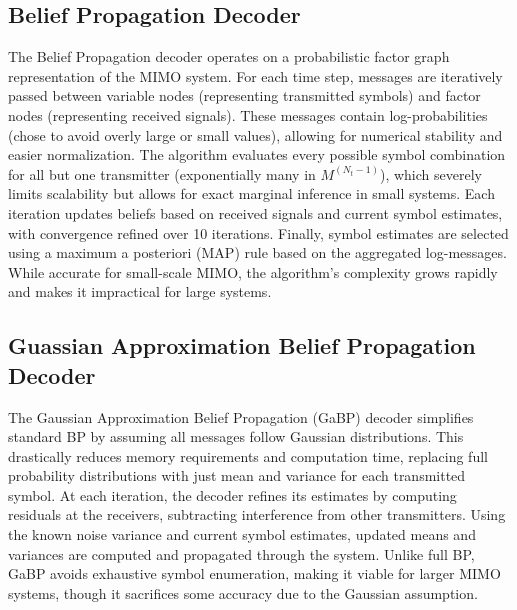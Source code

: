 \documentclass[conference]{IEEEtran}
\begin{document}
\subsection{Belief Propagation Decoder}
The Belief Propagation decoder operates on a probabilistic factor graph representation of the MIMO system. For each time step, messages are iteratively passed between variable nodes (representing transmitted symbols) and factor nodes (representing received signals). These messages contain log-probabilities (chose to avoid overly large or small values), allowing for numerical stability and easier normalization. The algorithm evaluates every possible symbol combination for all but one transmitter (exponentially many in $M^(N_t - 1)$), which severely limits scalability but allows for exact marginal inference in small systems. Each iteration updates beliefs based on received signals and current symbol estimates, with convergence refined over 10 iterations. Finally, symbol estimates are selected using a maximum a posteriori (MAP) rule based on the aggregated log-messages. While accurate for small-scale MIMO, the algorithm's complexity grows rapidly and makes it impractical for large systems.

\subsection{Guassian Approximation Belief Propagation Decoder}
The Gaussian Approximation Belief Propagation (GaBP) decoder simplifies standard BP by assuming all messages follow Gaussian distributions. This drastically reduces memory requirements and computation time, replacing full probability distributions with just mean and variance for each transmitted symbol. At each iteration, the decoder refines its estimates by computing residuals at the receivers, subtracting interference from other transmitters. Using the known noise variance and current symbol estimates, updated means and variances are computed and propagated through the system. Unlike full BP, GaBP avoids exhaustive symbol enumeration, making it viable for larger MIMO systems, though it sacrifices some accuracy due to the Gaussian assumption.
\end{document}
